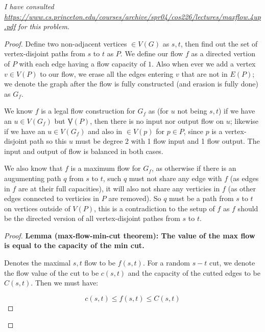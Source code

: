 \documentclass[11pt]{article}
\begin{document}
\textit{I have consulted \url{https://www.cs.princeton.edu/courses/archive/spr04/cos226/lectures/maxflow.4up.pdf} for this problem.}

\begin{proof}

Define two non-adjacent vertices $\in V(G)$ as $s, t$, then find out the set of vertex-disjoint paths from $s$ to $t$ as $P$. We define our flow $f$ as a directed vertion of $P$ with each edge having a flow capacity of $1$. Also when ever we add a vertex $v \in V(P)$ to our flow, we erase all the edges entering $v$ that are not in $E(P)$; we denote the graph after the flow is fully constructed (and erasion is fully done) as $G_f$.

We know $f$ is a legal flow construction for $G_f$ as (for $u$ not being $s, t$) if we have an $u \in V(G_f)$ but $\not V(P)$, then there is no input nor output flow on $u$; likewise if we have an $u \in V(G_f)$ and also in $\in V(p)$ for $p \in P$, since $p$ is a vertex-disjoint path so this $u$ must be degree 2 with 1 flow input and 1 flow output. The input and output of flow is balanced in both cases.

We also know that $f$ is a maximum flow for $G_f$, as otherwise if there is an augumenting path $q$ from $s$ to $t$, such $q$ must not share any edge with $f$ (as edges in $f$ are at their full capacities), it will also not share any verticies in $f$ (as other edges connected to verticies in $P$ are removed). So $q$ must be a path from $s$ to $t$ on vertices outside of $V(P)$, this is a contradiction to the setup of $f$ as $f$ should be the directed version of all vertex-disjoint pathes from $s$ to $t$.




\leavevmode\newline


    \begin{adjustwidth}{1cm}{}

    \begin{proof}
    \textbf{Lemma (max-flow-min-cut theorem):  The value of the max flow is equal to the capacity of the min cut.}\newline

    Denotes the maximal $s, t$ flow to be $f(s, t)$. For a random $s-t$ cut, we denote the flow value of the cut to be $c(s, t)$ and the capacity of the cutted edges to be $C(s, t)$. Then we must have:

    \begin{equation}
        c(s, t) \leq f(s, t) \leq C(s, t)
    \end{equation}


\end{proof}
\end{adjustwidth}
\end{proof}
\end{document}
